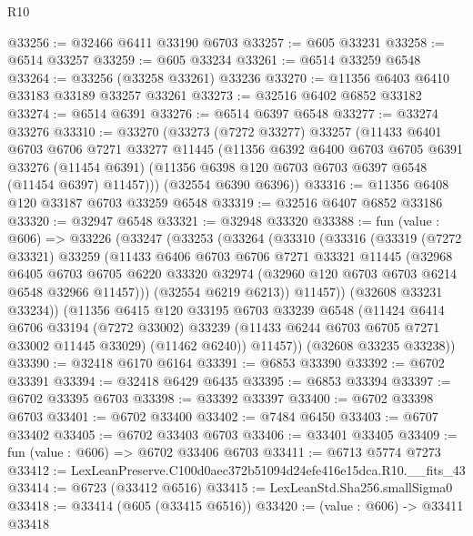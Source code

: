 \begin{lexlean}{R10}
\begin{coremodule}
@33256 := @32466 @6411 @33190 @6703
@33257 := @605 @33231
@33258 := @6514 @33257
@33259 := @605 @33234
@33261 := @6514 @33259 @6548
@33264 := @33256 (@33258 @33261) @33236
@33270 := @11356 @6403 @6410 @33183 @33189 @33257 @33261
@33273 := @32516 @6402 @6852 @33182
@33274 := @6514 @6391
@33276 := @6514 @6397 @6548
@33277 := @33274 @33276
@33310 := @33270
    (@33273
      (@7272 @33277)
      @33257
      (@11433
        @6401
        @6703
        @6706
        @7271
        @33277
        @11445
        (@11356
          @6392
          @6400
          @6703
          @6705
          @6391
          @33276
          (@11454 @6391)
          (@11356 @6398 @120 @6703 @6703 @6397 @6548 (@11454 @6397) @11457)))
      (@32554 @6390 @6396))
@33316 := @11356 @6408 @120 @33187 @6703 @33259 @6548
@33319 := @32516 @6407 @6852 @33186
@33320 := @32947 @6548
@33321 := @32948 @33320
@33388 := fun (value : @606) =>
  @33226
    (@33247
      (@33253
        (@33264
          (@33310
            (@33316
              (@33319
                (@7272 @33321)
                @33259
                (@11433
                  @6406
                  @6703
                  @6706
                  @7271
                  @33321
                  @11445
                  (@32968
                    @6405
                    @6703
                    @6705
                    @6220
                    @33320
                    @32974
                    (@32960 @120 @6703 @6703 @6214 @6548 @32966 @11457)))
                (@32554 @6219 @6213))
              @11457))
          (@32608 @33231 @33234))
        (@11356
          @6415
          @120
          @33195
          @6703
          @33239
          @6548
          (@11424
            @6414
            @6706
            @33194
            (@7272 @33002)
            @33239
            (@11433 @6244 @6703 @6705 @7271 @33002 @11445 @33029)
            (@11462 @6240))
          @11457))
      (@32608 @33235 @33238))
@33390 := @32418 @6170 @6164
@33391 := @6853 @33390
@33392 := @6702 @33391
@33394 := @32418 @6429 @6435
@33395 := @6853 @33394
@33397 := @6702 @33395 @6703
@33398 := @33392 @33397
@33400 := @6702 @33398 @6703
@33401 := @6702 @33400
@33402 := @7484 @6450
@33403 := @6707 @33402
@33405 := @6702 @33403 @6703
@33406 := @33401 @33405
@33409 := fun (value : @606) => @6702 @33406 @6703
@33411 := @6713 @5774 @7273
@33412 := LexLeanPreserve.C100d0aec372b51094d24efe416e15dca.R10.__fits_43
@33414 := @6723 (@33412 @6516)
@33415 := LexLeanStd.Sha256.smallSigma0
@33418 := @33414 (@605 (@33415 @6516))
@33420 := (value : @606) -> @33411 @33418

\end{coremodule}
\end{lexlean}
